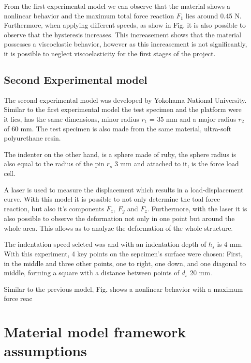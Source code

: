  From the first experimental model we can observe that the material shows a nonlinear 
 behavior and the maximum total force reaction \(F_1\) lies around 0.45 N. %
 Furthermore, when applying different speeds, as show in Fig. %
 it is also possible to observe that 
 the hysteresis increases. %
This increasement shows that the material possesses a viscoelastic behavior, however
as this increasement is not significantly, it is possible to neglect viscoelasticity for 
the first stages of the project.

\subsection{Second Experimental model}
The second experimental model was developed by Yokohama National University. Similar to 
the first experimental model the test specimen and the platform were it lies, has the 
same dimensions, minor radius \(r_1\) = 35 mm and a major radius \(r_2\) of 60 mm. The
test specimen is also made from the same material, ultra-soft polyurethane resin.

The indenter on the other hand, is a sphere made of ruby, the sphere radius is also 
equal to the radius of the pin \(r_s\) 3 mm and attached to it, is the force load cell.

A laser is used to measure the displacement which results in a load-displacement curve.
With this model it is possible to not only determine the toal force reaction, but also
it's components \(F_x\),  \(F_y\) and \(F_z\). Furthermore, with the laser it is also
possible to observe the deformation not only in one point but around the whole area. 
This allows as to analyze the deformation of the whole structure.

The indentation speed selcted was %
and with an indentation depth of \(h_s\) is 4 mm. With this experiment, 4 key points on 
the sepcimen's surface were chosen: First, in the middle and three other points, one to right, 
one down, and one diagonal to middle, forming a square with a distance between points 
of \(d_s\) 20 mm. %




Similar to the previous model, Fig. %
shows a nonlinear behavior with a maximum force reac


\section{Material model framework assumptions}


